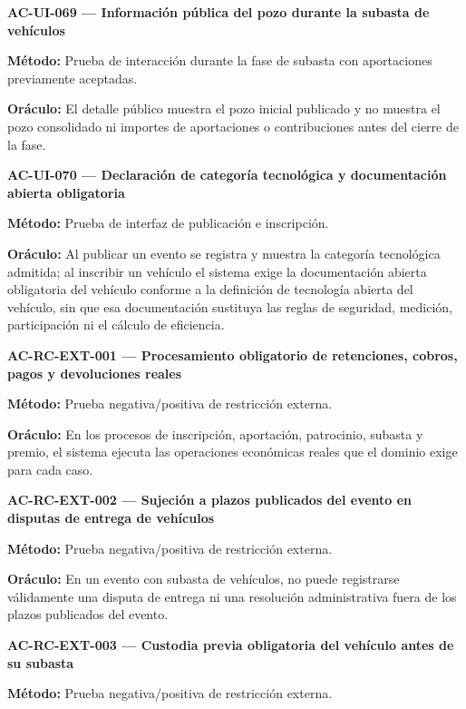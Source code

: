 \documentclass[10pt,letterpaper]{article}
\begin{document}
\noindent\textbf{AC-UI-069 --- Información pública del pozo durante la subasta de vehículos}\par
\textbf{Método:} Prueba de interacción durante la fase de subasta con aportaciones previamente aceptadas.\par
\textbf{Oráculo:} El detalle público muestra el pozo inicial publicado y no muestra el pozo consolidado ni importes de aportaciones o contribuciones antes del cierre de la fase.\par\vspace{0.45em}
\noindent\textbf{AC-UI-070 --- Declaración de categoría tecnológica y documentación abierta obligatoria}\par
\textbf{Método:} Prueba de interfaz de publicación e inscripción.\par
\textbf{Oráculo:} Al publicar un evento se registra y muestra la categoría tecnológica admitida; al inscribir un vehículo el sistema exige la documentación abierta obligatoria del vehículo conforme a la definición de tecnología abierta del vehículo, sin que esa documentación sustituya las reglas de seguridad, medición, participación ni el cálculo de eficiencia.\par\vspace{0.45em}
\noindent\textbf{AC-RC-EXT-001 --- Procesamiento obligatorio de retenciones, cobros, pagos y devoluciones reales}\par
\textbf{Método:} Prueba negativa/positiva de restricción externa.\par
\textbf{Oráculo:} En los procesos de inscripción, aportación, patrocinio, subasta y premio, el sistema ejecuta las operaciones económicas reales que el dominio exige para cada caso.\par\vspace{0.45em}
\noindent\textbf{AC-RC-EXT-002 --- Sujeción a plazos publicados del evento en disputas de entrega de vehículos}\par
\textbf{Método:} Prueba negativa/positiva de restricción externa.\par
\textbf{Oráculo:} En un evento con subasta de vehículos, no puede registrarse válidamente una disputa de entrega ni una resolución administrativa fuera de los plazos publicados del evento.\par\vspace{0.45em}
\noindent\textbf{AC-RC-EXT-003 --- Custodia previa obligatoria del vehículo antes de su subasta}\par
\textbf{Método:} Prueba negativa/positiva de restricción externa.\par
\end{document}
